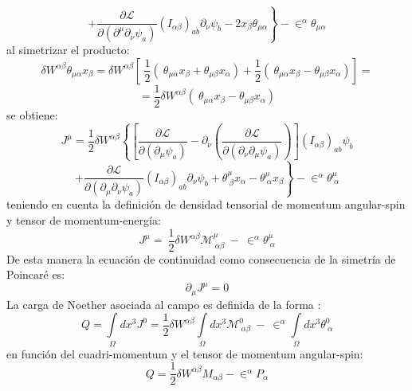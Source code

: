 \documentclass[a4paper,12pt]{article}
\begin{document}
$$\left.+  \frac{\partial\mathscr{L} }{\partial(\partial^{\mu}\partial_{\nu} \psi_a)}(I_{\alpha\beta})_{ab}\partial_\nu\psi_{b}-2x_\beta\theta_{\mu \alpha}\right\}-\in^{\alpha}\theta_{\mu \alpha}$$
al simetrizar el producto:
\begin{equation}
\delta W^{\alpha\beta}\theta_{\mu\alpha}x_\beta=\delta W^{\alpha\beta}\left[\ \frac{1}{2}\left(\ \theta_{\mu\alpha}x_\beta +\theta_{\mu\beta}x_\alpha  \right)+\frac{1}{2}\left(\ \theta_{\mu\alpha}x_\beta -\theta_{\mu\beta}x_\alpha  \right) \right]=
\end{equation}
$$=\frac{1}{2}\delta W^{\alpha\beta}\left(\ \theta_{\mu\alpha}x_\beta -\theta_{\mu\beta}x_\alpha  \right) $$
se obtiene:
$$J^\mu=\frac{1}{2}\delta W^{\alpha\beta}\left\{ \left[\frac{\partial \mathscr{L} }{\partial(\partial_{\mu} \psi_a)}-\partial_{\nu}\left(\frac{\partial\mathscr{L} }{\partial(\partial_{\nu}\partial_{\mu} \psi_a)}  \right) \right](I_{\alpha\beta})_{ab}\psi_{b}\right.$$
$$\left.+\frac{\partial\mathscr{L} }{\partial(\partial_{\mu}\partial_{\nu} \psi_a)}(I_{\alpha\beta})_{ab}\partial_\nu\psi_{b}+\theta_{\ \beta}^\mu x_\alpha-\theta_{\ \alpha}^\mu x_\beta  \right\}-\in^{\alpha}\theta_{\ \alpha}^\mu$$
teniendo en cuenta la definición de densidad tensorial de momentum angular-spin y tensor de momentum-energía:
\begin{equation}
J^\mu=\ \frac{1}{2}\delta W^{\alpha\beta}\mathscr{M}_{\ \alpha\beta}^\mu\ -\ \in^{\alpha}\theta_{\ \alpha}^\mu 
\end{equation}
De esta manera la ecuación de continuidad como consecuencia de la simetría de Poincaré es:
\begin{equation}
\partial_\mu J^{\mu}=0  
\end{equation}
La carga de Noether asociada al campo es definida de la forma \cite{greiner}:
\begin{equation}
Q=\int\limits_{\Omega}dx^{3}J^{0}=\frac{1}{2}\delta W^{\alpha\beta}\int\limits_{\Omega}dx^{3}\mathscr{M}_{\ \alpha\beta}^0\ -\ \in^{\alpha}\int\limits_{\Omega}dx^{3}\theta_{\ \alpha}^0 
\end{equation}
en función del cuadri-momentum y el tensor de momentum angular-spin:
\begin{equation}
Q=\frac{1}{2}\delta W^{\alpha\beta}M_{\alpha\beta}-\in^{\alpha}P_{\alpha}
\end{equation}
\vspace{0,4cm}

\\
\end{document}
